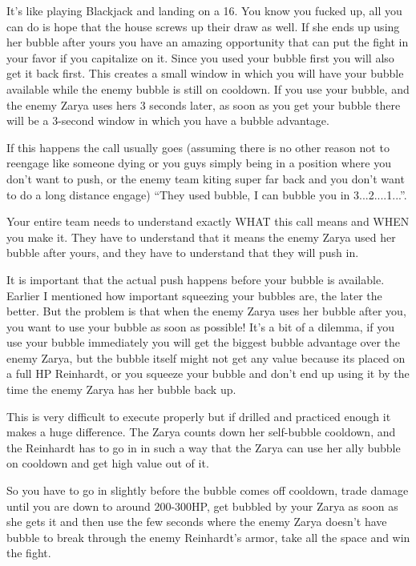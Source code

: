 It’s like playing Blackjack and landing on a 16. You know you fucked up, all you can do is hope that the house screws up their draw as well. If she ends up using her bubble after yours you have an amazing opportunity that can put the fight in your favor if you capitalize on it. Since you used your bubble first you will also get it back first. This creates a small window in which you will have your bubble available while the enemy bubble is still on cooldown. If you use your bubble, and the enemy Zarya uses hers 3 seconds later, as soon as you get your bubble there will be a 3-second window in which you have a bubble advantage.

If this happens the call usually goes (assuming there is no other reason not to reengage like someone dying or you guys simply being in a position where you don’t want to push, or the enemy team kiting super far back and you don't want to do a long distance engage) “They used bubble, I can bubble you in 3...2....1...”. 

Your entire team needs to understand exactly WHAT this call means and WHEN you make it. They have to understand that it means the enemy Zarya used her bubble after yours, and they have to understand that they will push in.

It is important that the actual push happens before your bubble is available. Earlier I mentioned how important squeezing your bubbles are, the later the better. But the problem is that when the enemy Zarya uses her bubble after you, you want to use your bubble as soon as possible! It’s a bit of a dilemma, if you use your bubble immediately you will get the biggest bubble advantage over the enemy Zarya, but the bubble itself might not get any value because its placed on a full HP Reinhardt, or you squeeze your bubble and don’t end up using it by the time the enemy Zarya has her bubble back up.

This is very difficult to execute properly but if drilled and practiced enough it makes a huge difference. The Zarya counts down her self-bubble cooldown, and the Reinhardt has to go in in such a way that the Zarya can use her ally bubble on cooldown and get high value out of it.

So you have to go in slightly before the bubble comes off cooldown, trade damage until you are down to around 200-300HP, get bubbled by your Zarya as soon as she gets it and then use the few seconds where the enemy Zarya doesn't have bubble to break through the enemy Reinhardt's armor, take all the space and win the fight. 


